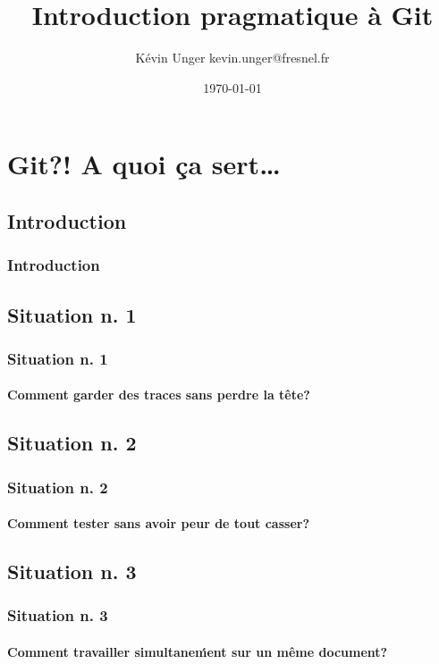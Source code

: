 \documentclass[t,11pt]{beamer}
\title{Introduction pragmatique à Git}
\author{K\'evin Unger\hspace{1mm} \newline kevin.unger@fresnel.fr}
\institute
{
        Institut Fresnel\\
        \url{https://github.com/kevung/git-presentation.git}
}
\date{\today}
\begin{document}
\begin{frame}[plain,c]
        \titlepage
\end{frame}

\begin{frame}[c]
        \tableofcontents[hideallsubsections]
\end{frame}

\section{Git?! A quoi ça sert\ldots}
\begin{frame}[c]
\end{frame}

\subsection{Introduction}
\begin{frame}[label=intro]
        \frametitle{Introduction}
\end{frame}


\subsection{Situation n. 1}
\begin{frame}[label=sit1]
        \frametitle{Situation n. 1}
        \framesubtitle{Comment garder des traces sans perdre la tête?}
\end{frame}


\subsection{Situation n. 2}
\begin{frame}[label=sit2]
        \frametitle{Situation n. 2}
        \framesubtitle{Comment tester sans avoir peur de tout casser?}
\end{frame}


\subsection{Situation n. 3}
\begin{frame}[label=sit3]
        \frametitle{Situation n. 3}
        \framesubtitle{Comment travailler simultane\'ment sur un même document?}
\end{frame}
\end{document}
